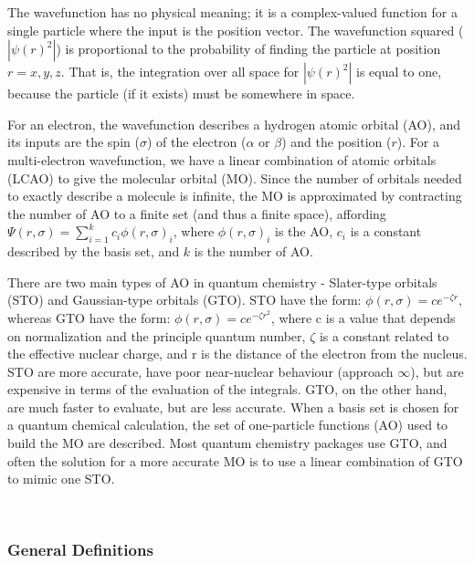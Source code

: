 \documentclass[12pt]{article}
\begin{document}
The wavefunction has no physical meaning; it is a complex-valued function for a 
single particle where the input is the position vector. The wavefunction 
squared ($|\psi(r)^2|$) is proportional to the probability of finding the 
particle at position $r = x,y,z$. That is, the integration over all space for 
$|\psi(r)^2|$ is equal to one, because the particle (if it exists) must be 
somewhere in space.

For an electron, the wavefunction describes a hydrogen atomic orbital (AO), and 
its inputs are the spin ($\sigma$) of the electron ($\alpha$ or $\beta$) and 
the position ($r$). For a multi-electron wavefunction, we have a linear 
combination of atomic orbitals (LCAO) to give the molecular orbital (MO). Since 
the number of orbitals needed to exactly describe a molecule is infinite, the 
MO is approximated by contracting the number of AO to a finite set (and thus a 
finite space), affording $\Psi(r, \sigma) = \sum\limits_{i=1}^{k}c_i 
\phi(r,\sigma)_i$, where $\phi(r,\sigma)_i$ is the AO, $c_i$ is a constant  
described by the basis set, and $k$ is the number of AO.

There are two main types of AO in quantum chemistry - Slater-type orbitals 
(STO) and Gaussian-type orbitals (GTO). STO have the form: $\phi(r,\sigma) = 
ce^{-\zeta r}$, whereas GTO have the form: $\phi(r,\sigma) = ce^{-\zeta r^2}$, 
where c is a value that depends on normalization and 
the principle quantum 
number, $\zeta$ is a constant related to the effective nuclear charge, and r is 
the distance of the electron from the nucleus. STO are more accurate, have poor 
near-nuclear behaviour (approach $\infty$), but are expensive in terms of the 
evaluation of the integrals. GTO, on the other hand, are much faster to 
evaluate, but are less accurate. When a basis set is chosen for a quantum 
chemical calculation, the set of one-particle functions (AO) used to build the 
MO are described. Most quantum chemistry packages use GTO, and often the 
solution for a more accurate MO is to use a linear combination of GTO to mimic 
one STO.


~\newline

\subsubsection{General Definitions}\label{sec_gendef}
\end{document}
